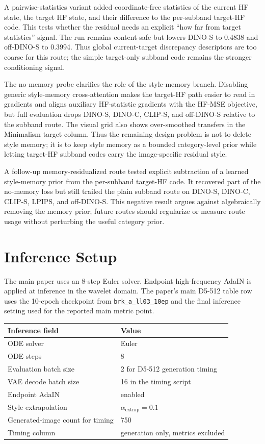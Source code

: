 \documentclass[10pt,twocolumn]{article}
\newcommand{\dinos}{DINO-S}
\newcommand{\dinoc}{DINO-C}
\newcommand{\clips}{CLIP-S}
\begin{document}
A pairwise-statistics variant added coordinate-free statistics of the current HF state,
the target HF state, and their difference to the per-subband target-HF code. This tests
whether the residual needs an explicit ``how far from target statistics'' signal.
The run remains content-safe but lowers \dinos{} to 0.4838 and off-\dinos{} to 0.3994.
Thus global current-target discrepancy descriptors are too coarse for this route; the
simple target-only subband code remains the stronger conditioning signal.

The no-memory probe clarifies the role of the style-memory branch. Disabling generic
style-memory cross-attention makes the target-HF path easier to read in gradients and
aligns auxiliary HF-statistic gradients with the HF-MSE objective, but full evaluation
drops \dinos{}, \dinoc{}, \clips{}, and off-\dinos{} relative to the subband route.
The visual grid also shows over-smoothed transfers in the Minimalism target column.
Thus the remaining design problem is not to delete style memory; it is to keep style
memory as a bounded category-level prior while letting target-HF subband codes carry
the image-specific residual style.

A follow-up memory-residualized route tested explicit subtraction of a learned
style-memory prior from the per-subband target-HF code. It recovered part of the
no-memory loss but still trailed the plain subband route on \dinos{}, \dinoc{},
\clips{}, LPIPS, and off-\dinos{}. This negative result argues against algebraically
removing the memory prior; future routes should regularize or measure route usage
without perturbing the useful category prior.

\section{Inference Setup}

The main paper uses an 8-step Euler solver. Endpoint high-frequency AdaIN is applied at
inference in the wavelet domain. The paper's main D5-512 table row uses the 10-epoch
checkpoint from \texttt{brk\_a\_ll03\_10ep} and the final inference setting used for
the reported main metric point.

\begin{center}
\begin{tabular}{ll}
\toprule
Inference field & Value \\
\midrule
ODE solver & Euler \\
ODE steps & 8 \\
Evaluation batch size & 2 for D5-512 generation timing \\
VAE decode batch size & 16 in the timing script \\
Endpoint AdaIN & enabled \\
Style extrapolation & \(\alpha_{\mathrm{extrap}}=0.1\) \\
Generated-image count for timing & 750 \\
Timing column & generation only, metrics excluded \\
\bottomrule
\end{tabular}
\end{center}
\end{document}
